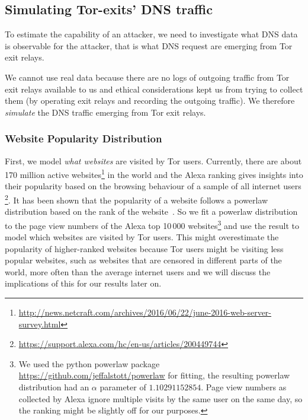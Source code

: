 \subsection{Simulating Tor-exits' DNS traffic}
To estimate the capability of an attacker, we need to investigate what
DNS data is observable for the attacker, that is what DNS request are
emerging from Tor exit relays.

We cannot use real data because there are no logs of outgoing traffic
from Tor exit relays available to us and ethical considerations kept us
from trying to collect them (\eg by operating exit relays and recording
the outgoing traffic). We therefore \emph{simulate} the DNS traffic
emerging from Tor exit relays.

\subsubsection{Website Popularity Distribution}
First, we model \emph{what websites} are visited by Tor users.
Currently, there are about 170 million active
websites\footnote{\url{http://news.netcraft.com/archives/2016/06/22/june-2016-web-server-survey.html}}
in the world and the Alexa ranking gives insights into their popularity
based on the browsing behaviour of a sample of all internet users
\footnote{\url{https://support.alexa.com/hc/en-us/articles/200449744}}.
It has been shown that the popularity of a website follows a powerlaw
distribution based on the rank of the
website~\cite{DBLP:journals/network/MahantiCMAW13}. So
we fit a powerlaw distribution to the page view numbers of the Alexa top
10\,000 websites\footnote{We used the python powerlaw package
		\url{https://github.com/jeffalstott/powerlaw} for fitting, the
		resulting powerlaw distribution had an $\alpha$ parameter of
		$1.10291152854$. Page view numbers as collected by Alexa ignore
		multiple visits by the same user on the same day, so the ranking
		might be slightly off for our purposes.} and use the result to
model which websites are visited by Tor users.
This might overestimate the popularity of higher-ranked websites because
Tor users might be visiting less popular websites, such as websites that
are censored in different parts of the world, more often than the
average internet users and we will discuss the implications of this for
our results later on.

